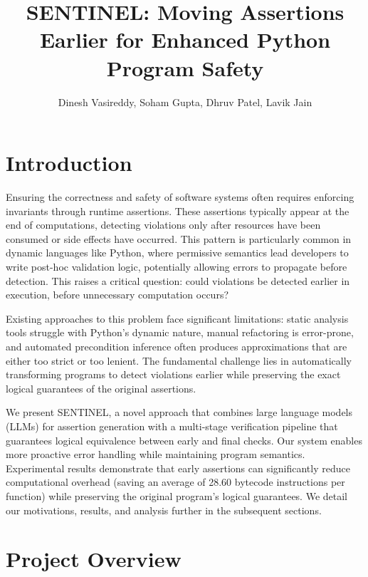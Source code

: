 \documentclass[8pt]{extarticle}
\title{SENTINEL: Moving Assertions Earlier for Enhanced Python Program Safety}
\author{Dinesh Vasireddy, Soham Gupta, Dhruv Patel, Lavik Jain}
\begin{document}
\maketitle

\begin{center}
    \theauthor
\end{center}

\section{Introduction}

Ensuring the correctness and safety of software systems often requires enforcing invariants through runtime assertions. These assertions typically appear at the end of computations, detecting violations only after resources have been consumed or side effects have occurred. This pattern is particularly common in dynamic languages like Python, where permissive semantics lead developers to write post-hoc validation logic, potentially allowing errors to propagate before detection. This raises a critical question: could violations be detected earlier in execution, before unnecessary computation occurs?

Existing approaches to this problem face significant limitations: static analysis tools struggle with Python's dynamic nature, manual refactoring is error-prone, and automated precondition inference often produces approximations that are either too strict or too lenient. The fundamental challenge lies in automatically transforming programs to detect violations earlier while preserving the exact logical guarantees of the original assertions.

We present SENTINEL, a novel approach that combines large language models (LLMs) for assertion generation with a multi-stage verification pipeline that guarantees logical equivalence between early and final checks. Our system enables more proactive error handling while maintaining program semantics. Experimental results demonstrate that early assertions can significantly reduce computational overhead (saving an average of 28.60 bytecode instructions per function) while preserving the original program's logical guarantees. We detail our motivations, results, and analysis further in the subsequent sections. 

\section{Project Overview}
\end{document}
